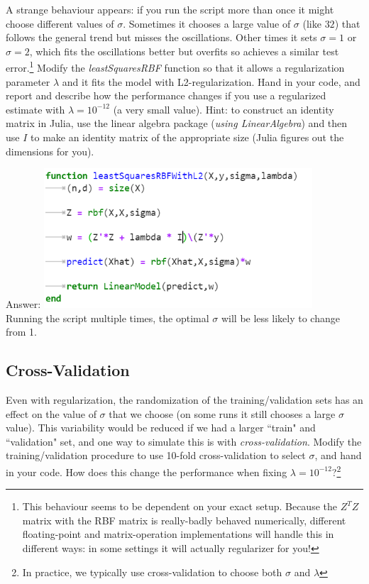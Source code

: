 \documentclass{article}
\def\ans#1{\par\gre{Answer: #1}}
\def\blu#1{{\color{blu}#1}}
\def\gre#1{{\color{gre}#1}}
\begin{document}
A strange behaviour appears: if you run the script more than once it might choose different values of $\sigma$. Sometimes it chooses a large value of $\sigma$ (like $32$) that follows the general trend but misses the oscillations. Other times it sets $\sigma = 1$ or $\sigma=2$, which fits the oscillations better but overfits so achieves a similar test error.\footnote{This behaviour seems to be dependent on your exact setup. Because the $Z^TZ$ matrix with the RBF matrix is really-badly behaved numerically, different floating-point and matrix-operation implementations will handle this in different ways: in some settings it will actually regularizer for you!} \blu{Modify the \emph{leastSquaresRBF} function so that it allows a regularization parameter $\lambda$ and it fits the model with L2-regularization. Hand in your code, and report and describe how the performance changes if you use a regularized estimate with $\lambda = 10^{-12}$ (a very small value).}
Hint: to construct an identity matrix in Julia, use the linear algebra package (\emph{using LinearAlgebra}) and then use $I$ to make an identity matrix of the appropriate size (Julia figures out the dimensions for you).
\ans{\includegraphics[width=10cm]{Q1.PNG} \\
Running the script multiple times, the optimal $\sigma$ will be less likely to change from 1.}


\subsection{Cross-Validation}

Even with regularization, the randomization of the training/validation sets has an effect on the value of $\sigma$ that we choose (on some runs it still chooses a large $\sigma$ value).
This variability would be reduced if we had a larger ``train" and ``validation" set, and one way to simulate this is with \emph{cross-validation}. \blu{Modify the training/validation procedure to use 10-fold cross-validation to select $\sigma$, and hand in your code. How does this change the performance when fixing $\lambda = 10^{-12}$?}\footnote{In practice, we typically use cross-validation to choose both $\sigma$ and $\lambda$}
\end{document}
